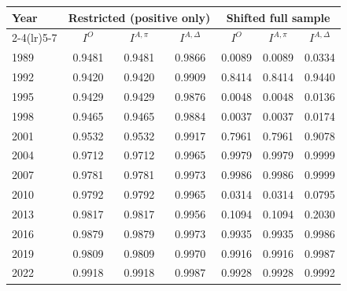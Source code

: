 \begin{tabular}{lcccccc}
\toprule
Year & \multicolumn{3}{c}{Restricted (positive only)} & \multicolumn{3}{c}{Shifted full sample} \\
\cmidrule(lr){2-4}\cmidrule(lr){5-7}
& $I^{O}$ & $I^{A,\pi}$ & $I^{A,\Delta}$ & $I^{O}$ & $I^{A,\pi}$ & $I^{A,\Delta}$ \\
\midrule
1989 & 0.9481 & 0.9481 & 0.9866 & 0.0089 & 0.0089 & 0.0334 \\
1992 & 0.9420 & 0.9420 & 0.9909 & 0.8414 & 0.8414 & 0.9440 \\
1995 & 0.9429 & 0.9429 & 0.9876 & 0.0048 & 0.0048 & 0.0136 \\
1998 & 0.9465 & 0.9465 & 0.9884 & 0.0037 & 0.0037 & 0.0174 \\
2001 & 0.9532 & 0.9532 & 0.9917 & 0.7961 & 0.7961 & 0.9078 \\
2004 & 0.9712 & 0.9712 & 0.9965 & 0.9979 & 0.9979 & 0.9999 \\
2007 & 0.9781 & 0.9781 & 0.9973 & 0.9986 & 0.9986 & 0.9999 \\
2010 & 0.9792 & 0.9792 & 0.9965 & 0.0314 & 0.0314 & 0.0795 \\
2013 & 0.9817 & 0.9817 & 0.9956 & 0.1094 & 0.1094 & 0.2030 \\
2016 & 0.9879 & 0.9879 & 0.9973 & 0.9935 & 0.9935 & 0.9986 \\
2019 & 0.9809 & 0.9809 & 0.9970 & 0.9916 & 0.9916 & 0.9987 \\
2022 & 0.9918 & 0.9918 & 0.9987 & 0.9928 & 0.9928 & 0.9992 \\
\bottomrule
\end{tabular}

